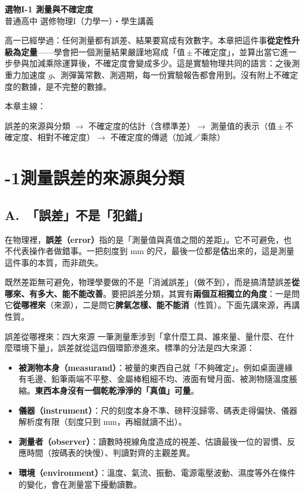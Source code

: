\documentclass[11pt]{article}
\begin{document}
\begin{center}
{\sffamily\Huge\bfseries 選物I-1 測量與不確定度}\\[3pt]
{\sffamily\large 普通高中 選修物理I（力學一）・學生講義}
\end{center}
\vspace{0.6em}

高一已經學過：任何測量都有誤差、結果要寫成有效數字。本章把這件事\textbf{從定性升級為定量}——學會把一個測量結果嚴謹地寫成「值\,$\pm$\,不確定度」，並算出當它進一步參與加減乘除運算後，不確定度會變成多少。這是實驗物理共同的語言：之後測重力加速度 $g$、測彈簧常數、測週期，每一份實驗報告都會用到。沒有附上不確定度的數據，是不完整的數據。

\medskip
本章主線：

\begin{center}
誤差的來源與分類 $\rightarrow$ 不確定度的估計（含標準差）$\rightarrow$ 測量值的表示（值\,$\pm$\,不確定度、相對不確定度）$\rightarrow$ 不確定度的傳遞（加減／乘除）
\end{center}

\section*{-1\quad 測量誤差的來源與分類}

\subsection*{\sffamily A.\ 「誤差」不是「犯錯」}

在物理裡，\textbf{誤差（error）}指的是「測量值與真值之間的差距」。它不可避免，也不代表操作者做錯事。一把刻度到 mm 的尺，最後一位都是\textbf{估}出來的，這是測量這件事的本質，而非疏失。

既然差距無可避免，物理學要做的不是「消滅誤差」（做不到），而是搞清楚誤差\textbf{從哪來、有多大、能不能改善}。要把誤差分類，其實有\textbf{兩個互相獨立的角度}：一是問它\textbf{從哪裡來}（來源），二是問它\textbf{脾氣怎樣、能不能消}（性質）。下面先講來源，再講性質。

\begin{補充框}{誤差從哪裡來：四大來源}
一筆測量牽涉到「拿什麼工具、誰來量、量什麼、在什麼環境下量」，誤差就從這四個環節滲進來。標準的分法是四大來源：
\begin{itemize}\setlength{\itemsep}{2pt}
\item \textbf{被測物本身（measurand）}：被量的東西自己就「不夠確定」。例如桌面邊緣有毛邊、鉛筆兩端不平整、金屬棒粗細不均、液面有彎月面、被測物隨溫度脹縮。\textbf{東西本身沒有一個乾乾淨淨的「真值」可量}。
\item \textbf{儀器（instrument）}：尺的刻度本身不準、磅秤沒歸零、碼表走得偏快、儀器解析度有限（刻度只到 mm，再細就讀不出）。
\item \textbf{測量者（observer）}：讀數時視線角度造成的視差、估讀最後一位的習慣、反應時間（按碼表的快慢）、判讀對齊的主觀差異。
\item \textbf{環境（environment）}：溫度、氣流、振動、電源電壓波動、濕度等外在條件的變化，會在測量當下擾動讀數。
\end{itemize}
\end{補充框}
\end{document}
